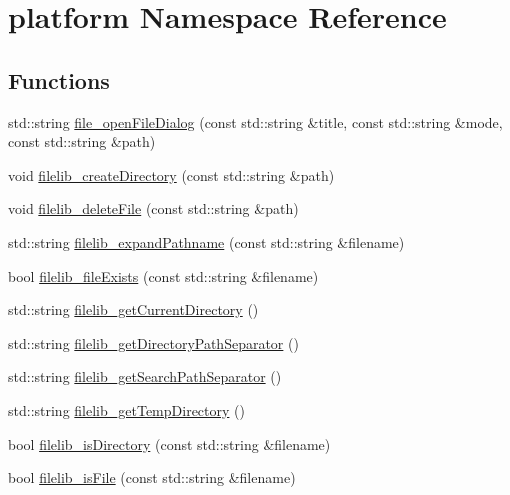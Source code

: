 \hypertarget{namespaceplatform}{}\section{platform Namespace Reference}
\label{namespaceplatform}
\subsection*{Functions}
\begin{DoxyCompactItemize}
\item 
std\+::string \mbox{\hyperlink{namespaceplatform_aa812fb80e0cb15f75d35975ea91e8f2b}{file\+\_\+open\+File\+Dialog}} (const std\+::string \&title, const std\+::string \&mode, const std\+::string \&path)
\item 
void \mbox{\hyperlink{namespaceplatform_aa30655cd42c277a7c5ed7aba21cf0050}{filelib\+\_\+create\+Directory}} (const std\+::string \&path)
\item 
void \mbox{\hyperlink{namespaceplatform_a50db655854102498e7bbc1d5f409a29f}{filelib\+\_\+delete\+File}} (const std\+::string \&path)
\item 
std\+::string \mbox{\hyperlink{namespaceplatform_a7aec69b6d9120eefca74eeba8f7eb02d}{filelib\+\_\+expand\+Pathname}} (const std\+::string \&filename)
\item 
bool \mbox{\hyperlink{namespaceplatform_a7ac56ce70edb176e3d75d83732517d85}{filelib\+\_\+file\+Exists}} (const std\+::string \&filename)
\item 
std\+::string \mbox{\hyperlink{namespaceplatform_a52fd33354355f61a96ea88ac33aaa11a}{filelib\+\_\+get\+Current\+Directory}} ()
\item 
std\+::string \mbox{\hyperlink{namespaceplatform_abf9418d14665b0404fd9a942cd890151}{filelib\+\_\+get\+Directory\+Path\+Separator}} ()
\item 
std\+::string \mbox{\hyperlink{namespaceplatform_a9641200cba6781202640c6b723341af2}{filelib\+\_\+get\+Search\+Path\+Separator}} ()
\item 
std\+::string \mbox{\hyperlink{namespaceplatform_a969c5e3fc13cd635656eba2845bc932e}{filelib\+\_\+get\+Temp\+Directory}} ()
\item 
bool \mbox{\hyperlink{namespaceplatform_a68319ac7586223f385d7785f1b38e1b9}{filelib\+\_\+is\+Directory}} (const std\+::string \&filename)
\item 
bool \mbox{\hyperlink{namespaceplatform_aca0d9e2b4896bfd0f7a5cd64049188fc}{filelib\+\_\+is\+File}} (const std\+::string \&filename)
\item 

\end{DoxyCompactItemize}
